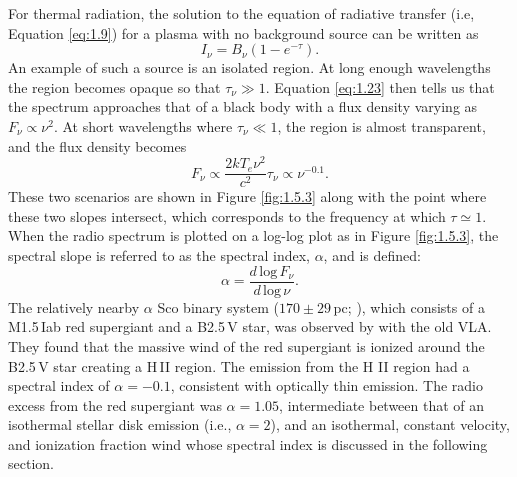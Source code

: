For thermal radiation, the solution to the equation of radiative transfer (i.e, Equation \ref{eq:1.9}) for a plasma with no background source can be written as 
\begin{equation}\label{eq:1.23}
I_{\nu} = B_{\nu}(1-e^{-\tau}).
\end{equation}
An example of such a source is an isolated  region. At long enough wavelengths the  region becomes opaque so that $\tau _{\nu} \gg 1$. Equation \ref{eq:1.23} then tells us that the spectrum approaches that of a black body with a flux density varying as $F_{\nu} \propto \nu ^{2}$. At short wavelengths where $\tau _{\nu} \ll 1$, the  region is almost transparent, and the flux density becomes
\begin{equation}
F_{\nu} \propto \frac{2kT_{e}\nu ^2}{c^2}\tau _{\nu} \propto \nu ^{-0.1}.
\end{equation}
These two scenarios are shown in Figure \ref{fig:1.5.3} along with the point where these two slopes intersect, which corresponds to the frequency at which $\tau \simeq 1$. When the radio spectrum is plotted on a log-log plot as in Figure \ref{fig:1.5.3}, the spectral slope is referred to as the spectral index, $\alpha$, and is defined:
\begin{equation}
\alpha = \frac{d\,\mathrm{log}\,F_{\nu}}{d\,\mathrm{log}\,\nu}.
\end{equation}
The relatively nearby $\alpha$ Sco binary system ($170 \pm 29$\,pc; \citealt{van_leeuwen_2007}), which consists of a M1.5\,Iab red supergiant and a B2.5\,V star, was observed by \cite{hjellming_1983} with the old VLA. They found that the massive wind of the red supergiant is ionized around the B2.5\,V star creating a H\,II region. The emission from the H II region had a spectral index of $\alpha = - 0.1$, consistent with optically thin emission. The radio excess from the red supergiant was $\alpha = 1.05$, intermediate between that of an isothermal stellar disk emission (i.e., $\alpha = 2$), and an isothermal, constant velocity, and ionization fraction wind whose spectral index is discussed in the following section.

